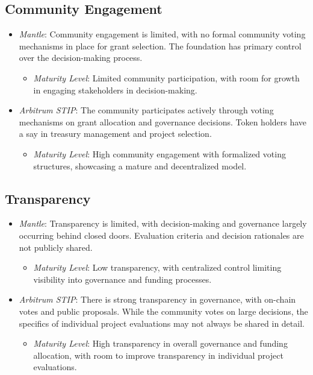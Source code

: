 \documentclass[a4,10pt]{article}
\begin{document}
\subsection{Community Engagement}\label{sec_15.3}
\begin{itemize}
    \item \textit{Mantle}: Community engagement is limited, with no formal community voting mechanisms in place for grant selection. The foundation has primary control over the decision-making process.
    \begin{itemize}
        \item \textit{Maturity Level}: Limited community participation, with room for growth in engaging stakeholders in decision-making.
    \end{itemize}
    \item \textit{Arbitrum STIP}: The community participates actively through voting mechanisms on grant allocation and governance decisions. Token holders have a say in treasury management and project selection.
    \begin{itemize}
        \item \textit{Maturity Level}: High community engagement with formalized voting structures, showcasing a mature and decentralized model.
    \end{itemize}
\end{itemize}

\subsection{Transparency}\label{sec_15.4}
\begin{itemize}
    \item \textit{Mantle}: Transparency is limited, with decision-making and governance largely occurring behind closed doors. Evaluation criteria and decision rationales are not publicly shared.
    \begin{itemize}
        \item \textit{Maturity Level}: Low transparency, with centralized control limiting visibility into governance and funding processes.
    \end{itemize}
    \item \textit{Arbitrum STIP}: There is strong transparency in governance, with on-chain votes and public proposals. While the community votes on large decisions, the specifics of individual project evaluations may not always be shared in detail.
    \begin{itemize}
        \item \textit{Maturity Level}: High transparency in overall governance and funding allocation, with room to improve transparency in individual project evaluations.
    \end{itemize}
\end{itemize}
\end{document}

